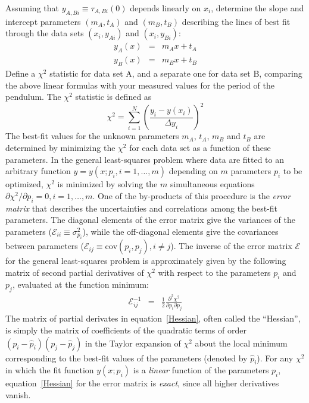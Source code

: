 \documentclass{revtex4}
\begin{document}
Assuming that $y_{A,Bi} \equiv \tau_{A,Bi}(0)$ depends linearly on $x_i$, determine the slope and intercept parameters $(m_A, t_A)$ and $(m_B, t_B)$ describing the lines of best fit through the data sets $(x_i,y_{Ai})$ and $(x_i,y_{Bi})$:
\begin{eqnarray}
y_A(x) &=& m_A x + t_A \label{eq:lineA} \\
y_B(x) &=& m_B x + t_B \label{eq:lineB}
\end{eqnarray}
Define a $\chi^2$ statistic for data set A, and a separate one for data
set B, comparing the above linear formulas with your measured values for
the period of the pendulum.  The $\chi^2$ statistic is defined as
\begin{equation}
\chi^2 = \sum_{i=1}^N\left(\frac{y_i-y(x_i)}{\Delta y_i}\right)^2
\end{equation}
The best-fit values for the unknown parameters $m_A$, $t_A$, $m_B$ and $t_B$ are determined by minimizing the $\chi^2$ for each data set as a function of these parameters. In the general least-squares problem where data are fitted to an arbitrary function $y = y(x;p_i,i=1,\ldots,m)$ depending on $m$ parameters $p_i$ to be optimized, $\chi^2$ is minimized by solving the $m$ simultaneous equations $\partial \chi^2/\partial p_i = 0, i=1,\ldots,m$. One of the by-products of this procedure is the {\em error matrix} that describes the uncertainties and correlations among the best-fit parameters. The diagonal elements of the error matrix give the variances of the parameters ($\mathcal{E}_{ii} \equiv \sigma^2_{p_i}$), while the off-diagonal elements give the covariances between parameters ($\mathcal{E}_{ij} \equiv \mbox{cov}(p_i,p_j), i \ne j$). The inverse of the error matrix $\mathcal{E}$ for the general least-squares problem is approximately given by the following matrix of second partial derivatives of $\chi^2$ with respect to the parameters $p_i$ and $p_j$, evaluated at the function minimum:
\begin{eqnarray}
  \mathcal{E}^{-1}_{ij} &=& \frac{1}{2} \frac{\partial^2 \chi^2}{\partial p_i \partial p_j} \label{Hessian}
\end{eqnarray}
The matrix of partial derivates in equation~\eqref{Hessian}, often called the ``Hessian'', is simply the matrix of coefficients of the quadratic terms of order $(p_i - \hat{p}_i)(p_j - \hat{p}_j)$ in the Taylor expansion of $\chi^2$ about the local minimum corresponding to the best-fit values of the parameters (denoted by $\hat{p}_i$). For any $\chi^2$ in which the fit function $y(x; p_i)$ is a \emph{linear} function of the parameters $p_i$, equation~\eqref{Hessian} for the error matrix is \emph{exact}, since all higher derivatives vanish. 
\end{document}
